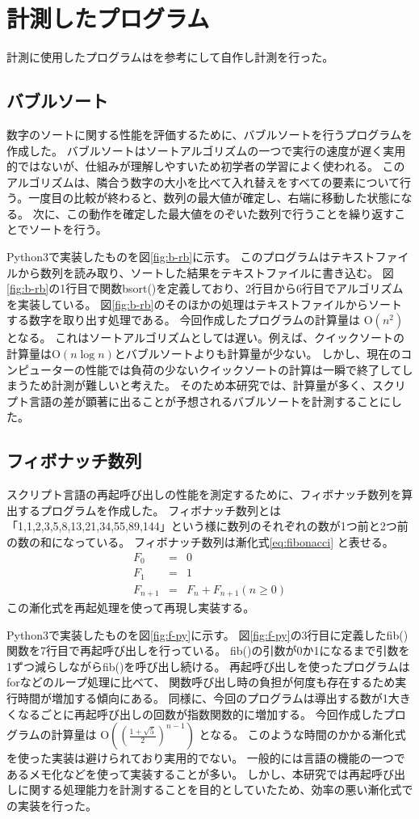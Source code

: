 \chapter{計測したプログラム}
\label{cha:program}
計測に使用したプログラムは\cite{Benchmark}を参考にして自作し計測を行った。
\section{バブルソート}
数字のソートに関する性能を評価するために、バブルソートを行うプログラムを作成した。
バブルソートはソートアルゴリズムの一つで実行の速度が遅く実用的ではないが、仕組みが理解しやすいため初学者の学習によく使われる。
このアルゴリズムは、隣合う数字の大小を比べて入れ替えをすべての要素について行う。一度目の比較が終わると、数列の最大値が確定し、右端に移動した状態になる。
次に、この動作を確定した最大値をのぞいた数列で行うことを繰り返すことでソートを行う。

Python3で実装したものを図\ref{fig:b-rb}に示す。
このプログラムはテキストファイルから数列を読み取り、ソートした結果をテキストファイルに書き込む。
図\ref{fig:b-rb}の1行目で関数bsort()を定義しており、2行目から6行目でアルゴリズムを実装している。
図\ref{fig:b-rb}のそのほかの処理はテキストファイルからソートする数字を取り出す処理である。
今回作成したプログラムの計算量は O$(n^{2})$ となる。
これはソートアルゴリズムとしては遅い。例えば、クイックソートの計算量はO$(n\log{n})$とバブルソートよりも計算量が少ない。
しかし、現在のコンピューターの性能では負荷の少ないクイックソートの計算は一瞬で終了してしまうため計測が難しいと考えた。
そのため本研究では、計算量が多く、スクリプト言語の差が顕著に出ることが予想されるバブルソートを計測することにした。

\section{フィボナッチ数列}
スクリプト言語の再起呼び出しの性能を測定するために、フィボナッチ数列を算出するプログラムを作成した。
フィボナッチ数列とは「1,1,2,3,5,8,13,21,34,55,89,144」という様に数列のそれぞれの数が1つ前と2つ前の数の和になっている。
フィボナッチ数列は漸化式\ref{eq:fibonacci} と表せる。
\begin{eqnarray} \label{eq:fibonacci}
  F_{0}&=&0 \nonumber \\
  F_{1}&=&1 \\
  F_{n+1}&=&F_{n}+F_{n+1}(n≥0)\nonumber
\end{eqnarray}
この漸化式を再起処理を使って再現し実装する。

Python3で実装したものを図\ref{fig:f-py}に示す。
図\ref{fig:f-py}の3行目に定義したfib()関数を7行目で再起呼び出しを行っている。
fib()の引数が0か1になるまで引数を1ずつ減らしながらfib()を呼び出し続ける。
再起呼び出しを使ったプログラムはforなどのループ処理に比べて、
関数呼び出し時の負担が何度も存在するため実行時間が増加する傾向にある。
同様に、今回のプログラムは導出する数が1大きくなるごとに再起呼び出しの回数が指数関数的に増加する。
今回作成したプログラムの計算量は O$((\frac{1 +\sqrt{5}}{2})^{n-1})$ となる。
このような時間のかかる漸化式を使った実装は避けられており実用的でない。
一般的には言語の機能の一つであるメモ化などを使って実装することが多い。
しかし、本研究では再起呼び出しに関する処理能力を計測することを目的としていたため、効率の悪い漸化式での実装を行った。

